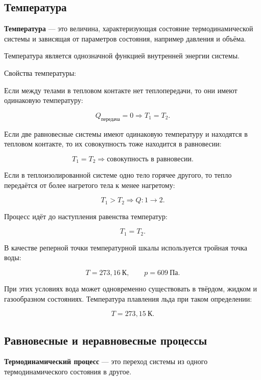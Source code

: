 \documentclass[a4paper,12pt]{article}
\begin{document}
\subsection*{Температура}

\begin{definitionbox}
\textbf{Температура} — это величина, характеризующая состояние термодинамической системы и зависящая от параметров состояния, например давления и объёма.
\end{definitionbox} 

Температура является однозначной функцией внутренней энергии системы. 

Свойства температуры:

Если между телами в тепловом контакте нет теплопередачи, то они имеют одинаковую температуру:

\[
Q_{\text{передача}}=0
\Rightarrow
T_1=T_2.
\]

Если две равновесные системы имеют одинаковую температуру и находятся в тепловом контакте, то их совокупность тоже находится в равновесии:

\[
T_1=T_2
\Rightarrow
\text{совокупность в равновесии}.
\]

Если в теплоизолированной системе одно тело горячее другого, то тепло передаётся от более нагретого тела к менее нагретому:

\[
T_1>T_2
\Rightarrow
Q:1 \to 2.
\]

Процесс идёт до наступления равенства температур:

\[
T_1=T_2.
\]

В качестве реперной точки температурной шкалы используется тройная точка воды:

\[
T=273{,}16\ \text{К},
\qquad
p=609\ \text{Па}.
\]

При этих условиях вода может одновременно существовать в твёрдом, жидком и газообразном состояниях. Температура плавления льда при таком определении:

\[
T=273{,}15\ \text{К}.
\]

\subsection*{Равновесные и неравновесные процессы}

\begin{definitionbox}
\textbf{Термодинамический процесс} — это переход системы из одного термодинамического состояния в другое.
\end{definitionbox}
\end{document}

